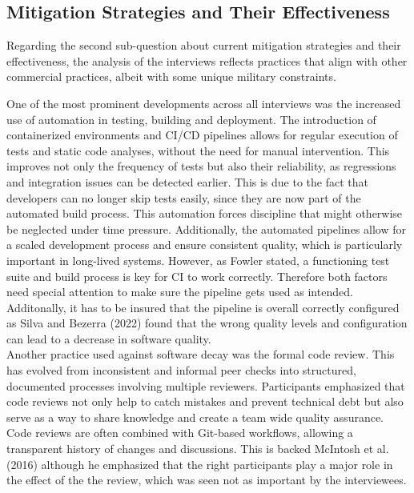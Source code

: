 \subsection{Mitigation Strategies and Their Effectiveness}
Regarding the second sub-question about current mitigation strategies and their effectiveness, the analysis of the interviews reflects practices that align with other commercial practices, albeit with some unique military constraints.

One of the most prominent developments across all interviews was the increased use of automation in testing, building and deployment. The introduction of containerized environments and CI/CD pipelines allows for regular execution of tests and static code analyses, without the need for manual intervention.
This improves not only the frequency of tests but also their reliability, as regressions and integration issues can be detected earlier. This is due to the fact that developers can no longer skip tests easily, since they are now part of the automated build process.
This automation forces discipline that might otherwise be neglected under time pressure. Additionally, the automated pipelines allow for a scaled development process and ensure consistent quality, which is particularly important in long-lived systems.
However, as Fowler stated, a functioning test suite and build process is key for CI to work correctly. Therefore both factors need special attention to make sure the pipeline gets used as intended.
Additonally, it has to be insured that the pipeline is overall correctly configured as Silva and Bezerra (2022) found that the wrong quality levels and configuration can lead to a decrease in software quality.\\

Another practice used against software decay was the formal code review. This has evolved from inconsistent and informal peer checks into structured, documented processes involving multiple reviewers. Participants emphasized that code reviews not only help to catch mistakes and prevent technical debt but also
serve as a way to share knowledge and create a team wide quality assurance. Code reviews are often combined with Git-based workflows, allowing a transparent history of changes and discussions. This is backed McIntosh et al. (2016) although he emphasized that the right participants play a major role in the effect of the the review,
which was seen not as important by the interviewees.\\


